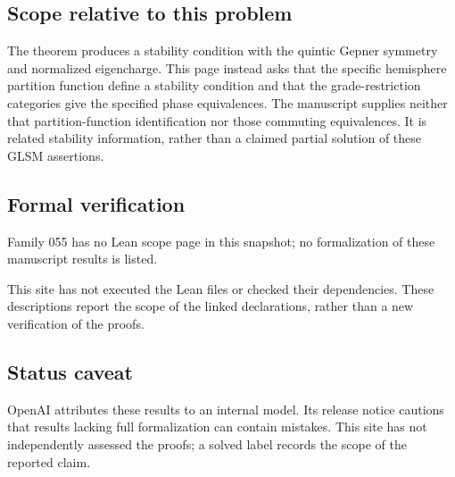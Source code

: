 \documentclass[11pt]{article}
\begin{document}
\subsection{Scope relative to this problem}
The theorem produces a stability condition with the quintic Gepner symmetry and normalized eigencharge. This page instead asks that the specific hemisphere partition function define a stability condition and that the grade-restriction categories give the specified phase equivalences. The manuscript supplies neither that partition-function identification nor those commuting equivalences. It is related stability information, rather than a claimed partial solution of these GLSM assertions.

\subsection{Formal verification}
Family 055 has no Lean scope page in this snapshot; no formalization of these manuscript results is listed.

This site has not executed the Lean files or checked their dependencies. These descriptions report the scope of the linked declarations, rather than a new verification of the proofs.

\subsection{Status caveat}
OpenAI attributes these results to an internal model. Its release notice cautions that results lacking full formalization can contain mistakes. This site has not independently assessed the proofs; a solved label records the scope of the reported claim.
\end{document}
